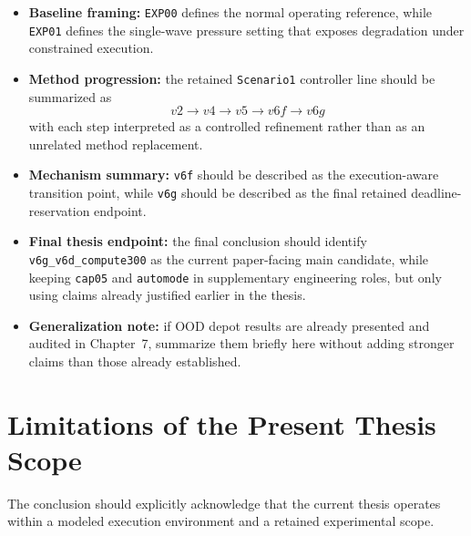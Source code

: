 \begin{itemize}
    \item \textbf{Baseline framing:}
    \texttt{EXP00} defines the normal operating reference, while \texttt{EXP01} defines the single-wave pressure setting that exposes degradation under constrained execution.

    \item \textbf{Method progression:}
    the retained \texttt{Scenario1} controller line should be summarized as
    \[
    v2 \rightarrow v4 \rightarrow v5 \rightarrow v6f \rightarrow v6g
    \]
    with each step interpreted as a controlled refinement rather than as an unrelated method replacement.

    \item \textbf{Mechanism summary:}
    \texttt{v6f} should be described as the execution-aware transition point, while \texttt{v6g} should be described as the final retained deadline-reservation endpoint.

    \item \textbf{Final thesis endpoint:}
    the final conclusion should identify \texttt{v6g\_v6d\_compute300} as the current paper-facing main candidate, while keeping \texttt{cap05} and \texttt{automode} in supplementary engineering roles, but only using claims already justified earlier in the thesis.

    \item \textbf{Generalization note:}
    if OOD depot results are already presented and audited in Chapter~7, summarize them briefly here without adding stronger claims than those already established.
\end{itemize}

%

\section{Limitations of the Present Thesis Scope}


The conclusion should explicitly acknowledge that the current thesis operates within a modeled execution environment and a retained experimental scope.

